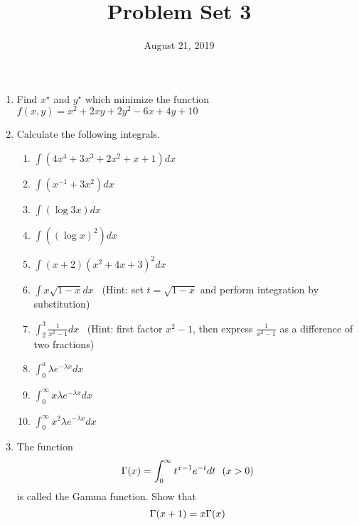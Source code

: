 \documentclass[pdflatex, letterpaper, 12pt]{scrartcl}
\title{Problem Set 3}
\date{August 21, 2019}
\begin{document}
\maketitle

\begin{enumerate}
\item Find $x^{\star}$ and $y^{\star}$ which minimize the function $f(x, y) = x^2 + 2xy + 2y^2 -6x + 4y + 10$

\item Calculate the following integrals.
 \begin{enumerate}[label=(\alph*)]
 \item $\int (4x^4 + 3x^3 + 2x^2 + x + 1) dx$
 \item $\int (x^{-1} + 3x^2) dx$
 \item $\int (\log 3x) dx$
 \item $\int ((\log x)^2) dx$
 \item $\int (x + 2)(x^2 + 4x + 3)^2 dx$
 \item $\int x\sqrt{1 - x} dx$ \ (Hint: set $t = \sqrt{1 - x}$ and perform integration by substitution)
 \item $\int_2^3 \frac{1}{x^2 - 1} dx$ \ (Hint: first factor $x^2 - 1$, then express $\frac{1}{x^2 - 1}$ as a difference of two fractions)
 \item $\int_0^a \lambda e^{-\lambda x} dx$
 \item $\int_0^{\infty} x\lambda e^{-\lambda x} dx$
 \item $\int_0^{\infty} x^2 \lambda e^{-\lambda x} dx$
 \end{enumerate}

\item The function
\begin{equation}
\Gamma(x) = \int_0^{\infty} t^{x - 1} e^{-t} dt \ \ (x > 0) \notag
\end{equation}
is called the Gamma function. Show that
\begin{equation}
\Gamma(x + 1) = x\Gamma(x) \notag
\end{equation}
 
\end{enumerate}
\end{document}
